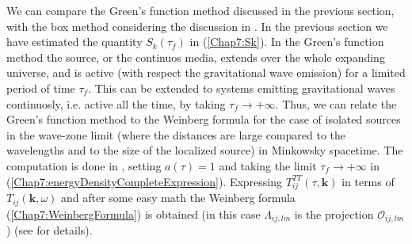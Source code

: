 \documentclass[11pt,a4paper,twoside]{book}
\begin{document}
We can compare the Green's function method discussed in the previous section, with the box method considering the discussion in \cite{Chap7:SpectralMethodComparison}. In the previous section we have estimated the quantity $ S_{k}(\tau_{f}) $ in (\ref{Chap7:Sk}). In the Green's function method  the source, or the continuos media, extends over the whole expanding universe, and is active (with respect the gravitational wave emission) for a limited period of time $\tau_{f}$. This can be extended to systems emitting gravitational waves continuosly, i.e. active all the time, by taking $ \tau_{f} \rightarrow +\infty $. Thus, we can relate the Green's function method to the Weinberg formula for the case of isolated sources in the wave-zone limit (where the distances are large compared to the wavelengths and to the size of the localized source) in Minkowsky spacetime. The computation is done in \cite{Chap7:GreenMethod},  setting $ a(\tau)=1 $  and taking the limit $ \tau_{f}\rightarrow +\infty $ in  (\ref{Chap7:energyDensityCompleteExpression}). Expressing $ T_{ij}^{TT}(\tau,\textbf{k}) $ in terms of $ T_{ij}(\textbf{k},\omega) $ and after some easy math the Weinberg formula (\ref{Chap7:WeinbergFormula}) is obtained (in this case $\Lambda_{ij,lm}$ is the projection $ \mathcal{O}_{ij,lm} $) (see \cite{Chap7:GreenMethod} for details).
\end{document}

